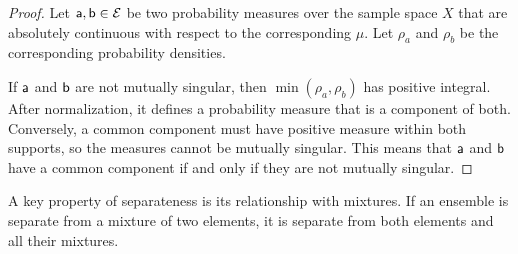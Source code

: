 \begin{mathSection}
\begin{proof}
	Let $\ens[a], \ens[b] \in \Ens$ be two probability measures over the sample space $X$ that are absolutely continuous with respect to the corresponding $\mu$. Let $\rho_a$ and $\rho_b$ be the corresponding probability densities.
	
	If $\ens[a]$ and $\ens[b]$ are not mutually singular, then $\min(\rho_a,\rho_b)$ has positive integral. After normalization, it defines a probability measure that is a component of both. Conversely, a common component must have positive measure within both supports, so the measures cannot be mutually singular. This means that $\ens[a]$ and $\ens[b]$ have a common component if and only if they are not mutually singular.
\end{proof}
\end{mathSection}

A key property of separateness is its relationship with mixtures. If an ensemble is separate from a mixture of two elements, it is separate from both elements and all their mixtures.

